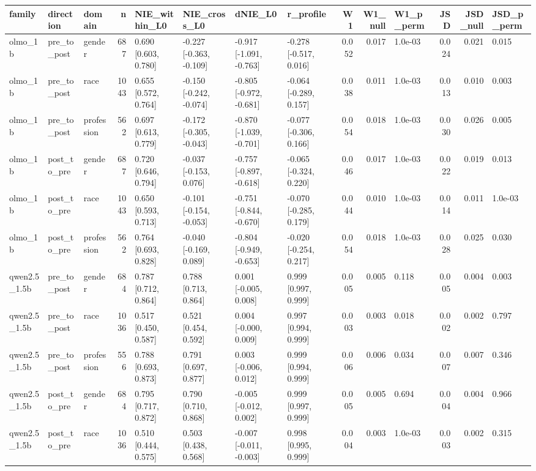 \begin{tabular}{lllrllllrrlrrl}
\toprule
family & direction & domain & n & NIE_within_L0 & NIE_cross_L0 & dNIE_L0 & r_profile & W1 & W1_null & W1_p_perm & JSD & JSD_null & JSD_p_perm \\
\midrule
olmo_1b & pre_to_post & gender & 687 & 0.690 [0.603, 0.780] & -0.227 [-0.363, -0.109] & -0.917 [-1.091, -0.763] & -0.278 [-0.517, 0.016] & 0.052 & 0.017 & 1.0e-03 & 0.024 & 0.021 & 0.015 \\
olmo_1b & pre_to_post & race & 1043 & 0.655 [0.572, 0.764] & -0.150 [-0.242, -0.074] & -0.805 [-0.972, -0.681] & -0.064 [-0.289, 0.157] & 0.038 & 0.011 & 1.0e-03 & 0.013 & 0.010 & 0.003 \\
olmo_1b & pre_to_post & profession & 562 & 0.697 [0.613, 0.779] & -0.172 [-0.305, -0.043] & -0.870 [-1.039, -0.701] & -0.077 [-0.306, 0.166] & 0.054 & 0.018 & 1.0e-03 & 0.030 & 0.026 & 0.005 \\
olmo_1b & post_to_pre & gender & 687 & 0.720 [0.646, 0.794] & -0.037 [-0.153, 0.076] & -0.757 [-0.897, -0.618] & -0.065 [-0.324, 0.220] & 0.046 & 0.017 & 1.0e-03 & 0.022 & 0.019 & 0.013 \\
olmo_1b & post_to_pre & race & 1043 & 0.650 [0.593, 0.713] & -0.101 [-0.154, -0.053] & -0.751 [-0.844, -0.670] & -0.070 [-0.285, 0.179] & 0.044 & 0.010 & 1.0e-03 & 0.014 & 0.011 & 1.0e-03 \\
olmo_1b & post_to_pre & profession & 562 & 0.764 [0.693, 0.828] & -0.040 [-0.169, 0.089] & -0.804 [-0.949, -0.653] & -0.020 [-0.254, 0.217] & 0.054 & 0.018 & 1.0e-03 & 0.028 & 0.025 & 0.030 \\
qwen2.5_1.5b & pre_to_post & gender & 684 & 0.787 [0.712, 0.864] & 0.788 [0.713, 0.864] & 0.001 [-0.005, 0.008] & 0.999 [0.997, 0.999] & 0.005 & 0.005 & 0.118 & 0.005 & 0.004 & 0.003 \\
qwen2.5_1.5b & pre_to_post & race & 1036 & 0.517 [0.450, 0.587] & 0.521 [0.454, 0.592] & 0.004 [-0.000, 0.009] & 0.997 [0.994, 0.999] & 0.003 & 0.003 & 0.018 & 0.002 & 0.002 & 0.797 \\
qwen2.5_1.5b & pre_to_post & profession & 556 & 0.788 [0.693, 0.873] & 0.791 [0.697, 0.877] & 0.003 [-0.006, 0.012] & 0.999 [0.994, 0.999] & 0.006 & 0.006 & 0.034 & 0.007 & 0.007 & 0.346 \\
qwen2.5_1.5b & post_to_pre & gender & 684 & 0.795 [0.717, 0.872] & 0.790 [0.710, 0.868] & -0.005 [-0.012, 0.002] & 0.999 [0.997, 0.999] & 0.005 & 0.005 & 0.694 & 0.004 & 0.004 & 0.966 \\
qwen2.5_1.5b & post_to_pre & race & 1036 & 0.510 [0.444, 0.575] & 0.503 [0.438, 0.568] & -0.007 [-0.011, -0.003] & 0.998 [0.995, 0.999] & 0.004 & 0.003 & 1.0e-03 & 0.003 & 0.002 & 0.315 \\

\end{tabular}
